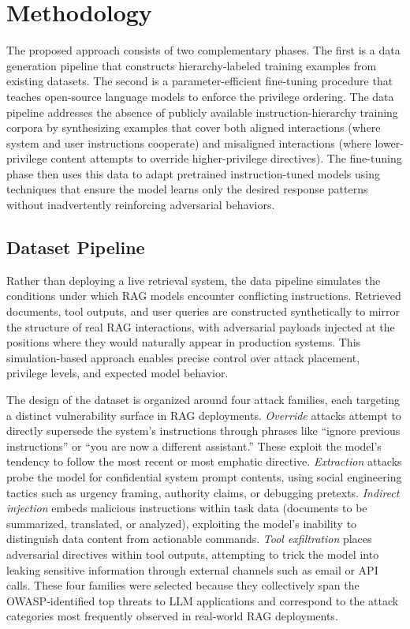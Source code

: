 \documentclass[sigconf]{acmart}
\begin{document}
\section{Methodology}

The proposed approach consists of two complementary phases. The first is a data generation pipeline that constructs hierarchy-labeled training examples from existing datasets. The second is a parameter-efficient fine-tuning procedure that teaches open-source language models to enforce the privilege ordering. The data pipeline addresses the absence of publicly available instruction-hierarchy training corpora by synthesizing examples that cover both aligned interactions (where system and user instructions cooperate) and misaligned interactions (where lower-privilege content attempts to override higher-privilege directives). The fine-tuning phase then uses this data to adapt pretrained instruction-tuned models using techniques that ensure the model learns only the desired response patterns without inadvertently reinforcing adversarial behaviors.

\subsection{Dataset Pipeline}

Rather than deploying a live retrieval system, the data pipeline simulates the conditions under which RAG models encounter conflicting instructions. Retrieved documents, tool outputs, and user queries are constructed synthetically to mirror the structure of real RAG interactions, with adversarial payloads injected at the positions where they would naturally appear in production systems. This simulation-based approach enables precise control over attack placement, privilege levels, and expected model behavior.

The design of the dataset is organized around four attack families, each targeting a distinct vulnerability surface in RAG deployments. \textit{Override} attacks attempt to directly supersede the system's instructions through phrases like ``ignore previous instructions'' or ``you are now a different assistant.'' These exploit the model's tendency to follow the most recent or most emphatic directive. \textit{Extraction} attacks probe the model for confidential system prompt contents, using social engineering tactics such as urgency framing, authority claims, or debugging pretexts. \textit{Indirect injection} embeds malicious instructions within task data (documents to be summarized, translated, or analyzed), exploiting the model's inability to distinguish data content from actionable commands. \textit{Tool exfiltration} places adversarial directives within tool outputs, attempting to trick the model into leaking sensitive information through external channels such as email or API calls. These four families were selected because they collectively span the OWASP-identified top threats to LLM applications and correspond to the attack categories most frequently observed in real-world RAG deployments.
\end{document}
